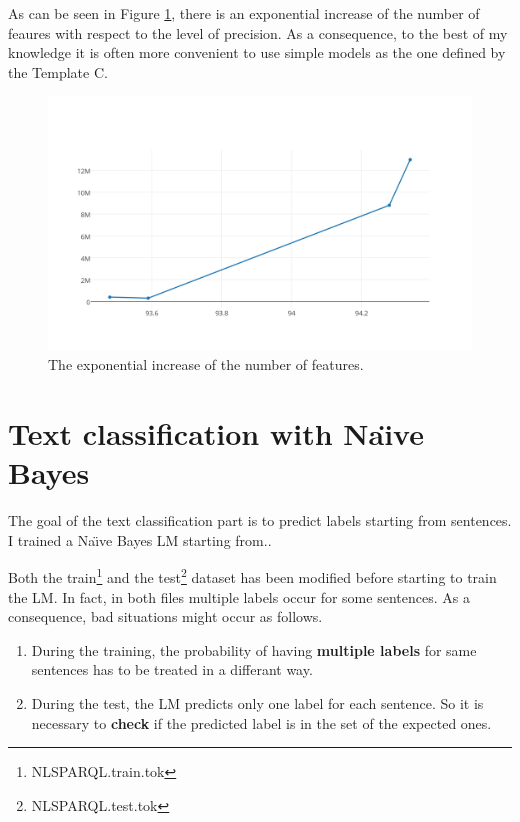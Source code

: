 \documentclass[a4paper,7pt,oneside]{book}
\begin{document}
As can be seen in Figure \ref{fig:crf_exp_num_features}, there is an exponential increase of the number of feaures with respect to the level of precision. As a consequence, to the best of my knowledge it is often more convenient to use simple models as the one defined by the Template C.

\begin{figure}[h]
  \centering
    \includegraphics[scale=0.5]{res/crf_exp_num_features}
    \caption{The exponential increase of the number of features.}
    \label{fig:crf_exp_num_features}
\end{figure}

\chapter{Text classification with Na\"{\i}ve Bayes}

The goal of the text classification part is to predict labels starting from sentences. I trained a Na\"{\i}ve Bayes LM starting from..


Both the train\footnote{NLSPARQL.train.tok} and the test\footnote{NLSPARQL.test.tok} dataset has been modified before starting to train the LM. In fact, in both files multiple labels occur for some sentences. As a consequence, bad situations might occur as follows.
\begin{enumerate}
\item During the training, the probability of having \textbf{multiple labels} for same sentences has to be treated in a differant way.
\item During the test, the LM predicts only one label for each sentence. So it is necessary to \textbf{check} if the predicted label is in the set of the expected ones.
\end{enumerate}
\end{document}
